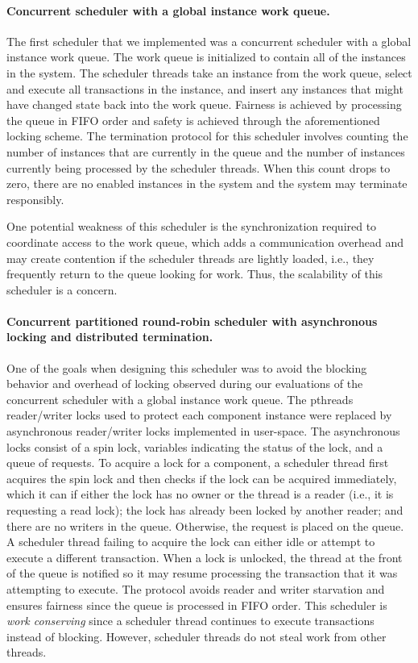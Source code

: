 \paragraph{Concurrent scheduler with a global instance work queue.}
The first scheduler that we implemented was a concurrent scheduler with a global instance work queue.
The work queue is initialized to contain all of the instances in the system.
The scheduler threads take an instance from the work queue, select and execute all transactions in the instance, and insert any instances that might have changed state back into the work queue.
Fairness is achieved by processing the queue in FIFO order and safety is achieved through the aforementioned locking scheme.
The termination protocol for this scheduler involves counting the number of instances that are currently in the queue and the number of instances currently being processed by the scheduler threads.
When this count drops to zero, there are no enabled instances in the system and the system may terminate responsibly.

One potential weakness of this scheduler is the synchronization required to coordinate access to the work queue, which adds a communication overhead and may create contention if the scheduler threads are lightly loaded, i.e., they frequently return to the queue looking for work.
Thus, the scalability of this scheduler is a concern.

\paragraph{Concurrent partitioned round-robin scheduler with asynchronous locking and distributed termination.}
One of the goals when designing this scheduler was to avoid the blocking behavior and overhead of locking observed during our evaluations of the concurrent scheduler with a global instance work queue.
The pthreads reader/writer locks used to protect each component instance were replaced by asynchronous reader/writer locks implemented in user-space.
The asynchronous locks consist of a spin lock, variables indicating the status of the lock, and a queue of requests.
To acquire a lock for a component, a scheduler thread first acquires the spin lock and then checks if the lock can be acquired immediately, which it can if either the lock has no owner or the thread is a reader (i.e., it is requesting a read lock); the lock has already been locked by another reader; and there are no writers in the queue.
Otherwise, the request is placed on the queue.
A scheduler thread failing to acquire the lock can either idle or attempt to execute a different transaction.
When a lock is unlocked, the thread at the front of the queue is notified so it may resume processing the transaction that it was attempting to execute.
The protocol avoids reader and writer starvation and ensures fairness since the queue is processed in FIFO order.
This scheduler is \emph{work conserving} since a scheduler thread continues to execute transactions instead of blocking.
However, scheduler threads do not steal work from other threads.

